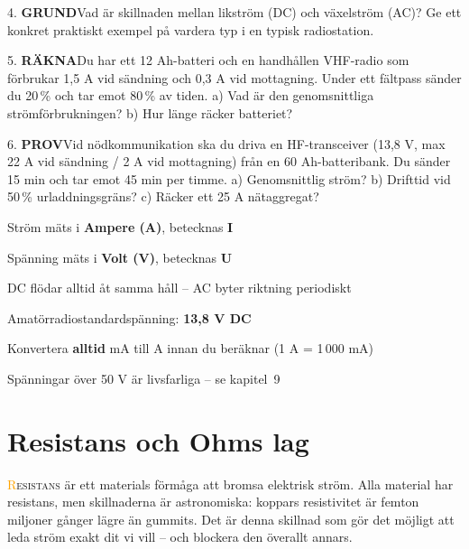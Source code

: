 \documentclass[a4paper,11pt,twoside]{book}
\newcommand{\emoji}[1]{{\emojifont #1}}
\newcommand{\qgrund}{\colorbox{greenpale}{\textcolor{greendark}{\headingfont\bfseries\tiny GRUND}}}
\newcommand{\qrakna}{\colorbox{bluepale}{\textcolor{bluedark}{\headingfont\bfseries\tiny RÄKNA}}}
\newcommand{\qprov}{\colorbox{redpale}{\textcolor{reddark}{\headingfont\bfseries\tiny PROV}}}
\begin{document}
\begin{qblock}{4.}
\qgrund\quad Vad är skillnaden mellan likström (DC) och växelström (AC)? Ge ett konkret praktiskt exempel på vardera typ i en typisk radiostation.
\end{qblock}

\begin{qblock}{5.}
\qrakna\quad Du har ett 12 Ah-batteri och en handhållen VHF-radio som förbrukar 1,5 A vid sändning och 0,3 A vid mottagning. Under ett fältpass sänder du 20\,\% och tar emot 80\,\% av tiden. a) Vad är den genomsnittliga strömförbrukningen? b) Hur länge räcker batteriet?
\end{qblock}

\begin{qblock}{6.}
\qprov\quad Vid nödkommunikation ska du driva en HF-transceiver (13,8 V, max 22 A vid sändning / 2 A vid mottagning) från en 60 Ah-batteribank. Du sänder 15 min och tar emot 45 min per timme. a) Genomsnittlig ström? b) Drifttid vid 50\,\% urladdningsgräns? c) Räcker ett 25 A nätaggregat?
\end{qblock}

\begin{orangebox}[title={\emoji{🎯} Viktigt för provet}]
\begin{checklist}
  \item Ström mäts i \textbf{Ampere (A)}, betecknas \textbf{I}
  \item Spänning mäts i \textbf{Volt (V)}, betecknas \textbf{U}
  \item DC flödar alltid åt samma håll – AC byter riktning periodiskt
  \item Amatörradiostandardspänning: \textbf{13,8 V DC}
  \item Konvertera \textbf{alltid} mA till A innan du beräknar (1 A = 1\,000 mA)
  \item Spänningar över 50 V är livsfarliga – se kapitel~9
\end{checklist}
\end{orangebox}

\section{Resistans och Ohms lag}

\lettrine[lines=2]{\textcolor{orange}{R}}{esistans} är ett materials förmåga att bromsa elektrisk ström. Alla material har resistans, men skillnaderna är astronomiska: koppars resistivitet är femton miljoner gånger lägre än gummits. Det är denna skillnad som gör det möjligt att leda ström exakt dit vi vill – och blockera den överallt annars.
\end{document}
